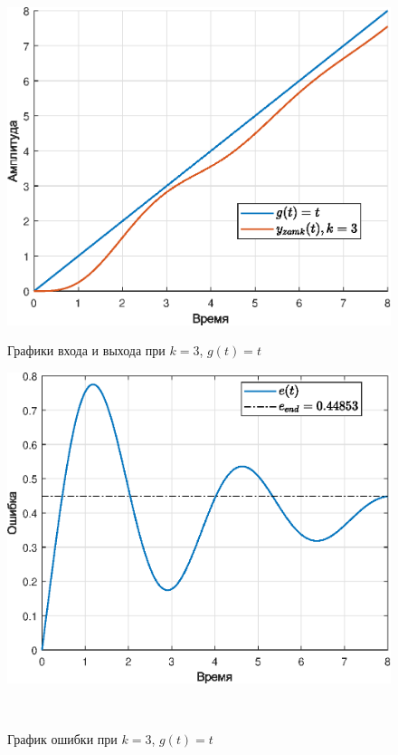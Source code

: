 \documentclass[a4paper]{article}
\begin{document}
\begin{figure}[H]
    \begin{minipage}{0.5\textwidth}
        \centering \includegraphics[width=\textwidth]{ex4/k3_g_vt.eps}
        \caption{Графики входа и выхода при $k=3$, $g(t)=t$}
    \end{minipage}\hfill
    \begin{minipage}{0.5\textwidth}
        \centering \includegraphics[width=\textwidth]{ex4/k3_g_vt_error.eps}
        \caption{График ошибки при $k=3$, $g(t)=t$}
    \end{minipage}\\[1em]
\end{figure}\noindent\
\end{document}
